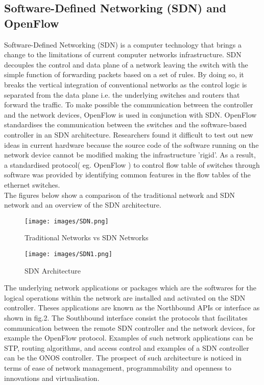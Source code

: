 \documentclass{article}
\begin{document}
\subsection{Software-Defined Networking (SDN) and OpenFlow} 
Software-Defined Networking (SDN) is a computer technology that brings a change to the limitations of current computer networks infrastructure. SDN\cite{6587999} decouples the control and data plane of a network leaving the switch with the simple function of forwarding packets based on a set of rules. By doing so, it breaks the vertical integration of conventional networks as the control logic is separated from the data plane i.e. the underlying switches and routers that forward the traffic\cite{6994333}. To make possible the communication between the controller and the network devices, OpenFlow\cite{6587999} is used in conjunction with SDN. OpenFlow standardises the communication between the switches and the software-based controller in an SDN architecture. Researchers found it difficult to test out new ideas in current hardware because the source code of the software running on the network device cannot be modified making the infrastructure 'rigid'. As a result, a standardised protocol( eg. OpenFlow ) to control flow table of switches through software was provided by identifying common features in the flow tables of the ethernet switches\cite{6587999}.\\The figures below show a comparison of the traditional network and SDN network and an overview of the SDN architecture.\\
    \begin{figure}[h]
        \centering
        \texttt{[image: images/SDN.png]}
        \caption{Traditional Networks vs SDN Networks}
        \label{SDN}
    \end{figure}
    
    \newpage
    \begin{figure}[h]
        \centering
        \texttt{[image: images/SDN1.png]}
        \caption{SDN Architecture}
        \label{SDN}
    \end{figure} 
The underlying network applications or packages which are the softwares for the logical operations within the network are installed and activated on the SDN controller. Theses applications are known as the Northbound APIs or interface as shown in fig.2. The Southbound interface consist the protocols that facilitates communication between the remote SDN controller and the network devices, for example the OpenFlow\cite{10220519} protocol. Examples of such network applications can be STP, routing algorithms, and access control and examples of a SDN controller can be the ONOS controller. The prospect of such architecture is noticed in terms of ease of network management, programmability and openness to innovations and virtualisation.
\end{document}
